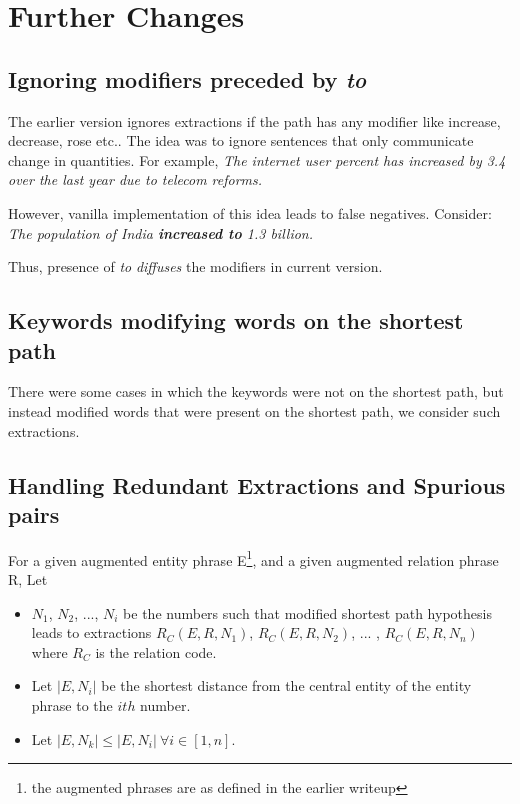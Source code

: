 \documentclass[a4paper,10pt]{article}
\title{}
\author{}
\begin{document}
\maketitle

\section{Further Changes}
\subsection{Ignoring modifiers preceded by \emph{to}}
The earlier version ignores extractions if the path has any modifier like increase, decrease, rose etc..
The idea was to ignore sentences that only communicate change in quantities. For example, 
\emph{The internet user percent has increased by 3.4 over the last year due to telecom reforms.}

However, vanilla implementation of this idea leads to false negatives. Consider:
\emph{The population of India \textbf{increased to} 1.3 billion.}

Thus, presence of \emph{to} \emph{diffuses} the modifiers in current version.

\subsection{Keywords modifying words on the shortest path}

There were some cases in which the keywords were not on the shortest path, but instead modified words 
that were present on the shortest path, we consider such extractions.


\subsection{Handling Redundant Extractions and Spurious pairs}

For a given augmented entity phrase E\footnote{the augmented phrases are as defined in the earlier writeup}, and a given augmented relation phrase R, Let
\begin{itemize}


\item $N_1$, $N_2$, ..., $N_i$ be the numbers such that modified shortest path hypothesis leads to extractions 
$R_C(E, R, N_1)$, $R_C(E, R, N_2)$, ... , $R_C(E, R, N_n)$ where $R_C$ is the relation code.
\item Let $|E, N_i|$ be the shortest distance from the central entity of the entity phrase to the $ith$ number. 

\item Let $|E, N_k| \leq |E, N_i| \  \forall i \in [1, n]$. 

\end{itemize}
\end{document}
